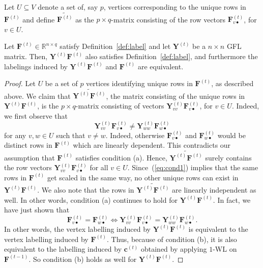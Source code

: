 Let $U\subseteq V$ denote  a set of, say $p$,  vertices corresponding to the unique rows in $\mathbf{F}^{(t)}$ and define
 $\widetilde{\mathbf{F}^{(t)}}$ as the $p\times q$-matrix consisting of  the row vectors $\mathbf{F}^{(t)}_{v\bullet}$, for $v\in U$.
\begin{lemma}\label{lem:gfl}
  Let $\mathbf{F}^{(t)} \in \mathbb{R}^{n \times q}$ satisfy Definition~\ref{def:label} and let $\mathbf{Y}^{(t)}$
  be a $n\times n$ GFL matrix. Then, $\mathbf{Y}^{(t)}\mathbf{F}^{(t)}$ also satisfies Definition~\ref{def:label}, and furthermore the labelings induced by $\mathbf{Y}^{(t)}\mathbf{F}^{(t)}$ and $\mathbf{F}^{(t)}$ are equivalent.
\end{lemma}
\begin{proof}
	Let $U$ be a set of $p$ vertices identifying unique rows in $\mathbf{F}^{(t)}$, as described above.
We claim  that $\widetilde{\mathbf{Y}^{(t)}\mathbf{F}^{(t)}}$, the matrix consisting of the unique
rows in $\mathbf{Y}^{(t)}\mathbf{F}^{(t)}$, is the $p\times q$-matrix consisting of vectors $\mathbf{Y}^{(t)}_{vv}\mathbf{F}^{(t)}_{v\bullet}$, for $v\in U$.  Indeed, we first observe that 
$$\mathbf{Y}^{(t)}_{vv}\mathbf{F}^{(t)}_{v\bullet}\neq \mathbf{Y}^{(t)}_{ww}\mathbf{F}^{(t)}_{w\bullet}$$
 for any $v, w\in U$ such that $v\neq w$. Indeed, otherwise $\mathbf{F}^{(t)}_{v\bullet}$ and $\mathbf{F}^{(t)}_{w\bullet}$ would
 be distinct rows in $\mathbf{F}^{(t)}$ which are linearly dependent. This contradicts our assumption that $\mathbf{F}^{(t)}$ satisfies condition (a).
Hence, $\widetilde{\mathbf{Y}^{(t)}\mathbf{F}^{(t)}}$ surely contains the row vectors $\mathbf{Y}^{(t)}_{vv}\mathbf{F}^{(t)}_{v\bullet}$ for all $v\in U$. Since~(\ref{eq:cond1}) implies that the same rows in $\mathbf{F}^{(t)}$ get scaled in the same way, no other unique rows can exist in $\mathbf{Y}^{(t)}\mathbf{F}^{(t)}$. We also note that the rows in $\widetilde{\mathbf{Y}^{(t)}\mathbf{F}^{(t)}}$ are linearly
independent as well. In other words, condition (a) continues to hold for $\mathbf{Y}^{(t)}\mathbf{F}^{(t)}$. In fact, we have just shown that 
$$\mathbf{F}_{v\bullet}^{(t)}=\mathbf{F}_{w\bullet}^{(t)} \Longleftrightarrow \mathbf{Y}^{(t)}_{vv}\mathbf{F}_{v\bullet}^{(t)}=\mathbf{Y}^{(t)}_{ww}\mathbf{F}_{w\bullet}^{(t)}.$$
In other words, the vertex labelling induced by $\mathbf{Y}^{(t)}\mathbf{F}^{(t)}$
is equivalent to the vertex labelling induced by $\mathbf{F}^{(t)}$. Thus, because of condition (b), it is also equivalent to the labelling induced by $\mathbf{c}^{(t)}$ obtained by applying $1$-WL on $\mathbf{F}^{(t-1)}$. So condition (b) holds as well for $\mathbf{Y}^{(t)}\mathbf{F}^{(t)}$.
\end{proof}

